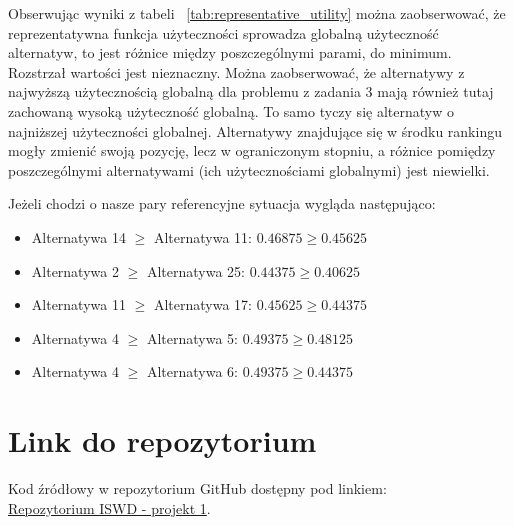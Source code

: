 \documentclass[11pt]{article}
\begin{document}
Obserwując wyniki z tabeli ~\ref{tab:representative_utility} można zaobserwować, że reprezentatywna funkcja użyteczności sprowadza globalną użyteczność alternatyw, to jest różnice między poszczególnymi parami, do minimum. Rozstrzał wartości jest nieznaczny. Można zaobserwować, że alternatywy z najwyższą użytecznością globalną dla problemu z zadania 3 mają również tutaj zachowaną wysoką użyteczność globalną. To samo tyczy się alternatyw o najniższej użyteczności globalnej. Alternatywy znajdujące się w środku rankingu mogły zmienić swoją pozycję, lecz w ograniczonym stopniu, a różnice pomiędzy poszczególnymi alternatywami (ich użytecznościami globalnymi) jest niewielki.

Jeżeli chodzi o nasze pary referencyjne sytuacja wygląda następująco:
\begin{itemize}
\item Alternatywa 14 $\geq$ Alternatywa 11: $0.46875 \geq 0.45625$
\item Alternatywa 2 $\geq$ Alternatywa 25: $0.44375 \geq 0.40625$
\item Alternatywa 11 $\geq$ Alternatywa 17: $0.45625 \geq 0.44375$
\item Alternatywa 4 $\geq$ Alternatywa 5: $0.49375 \geq 0.48125$
\item Alternatywa 4 $\geq$ Alternatywa 6: $0.49375 \geq 0.44375$
\end{itemize}

\section{Link do repozytorium}\label{sec:link-do-repo}
Kod źródłowy w repozytorium GitHub dostępny pod linkiem: \\
\href{https://github.com/KotZPolibudy/PUT_ISWD/tree/main/projekt1}{Repozytorium ISWD - projekt 1}.
\end{document}
